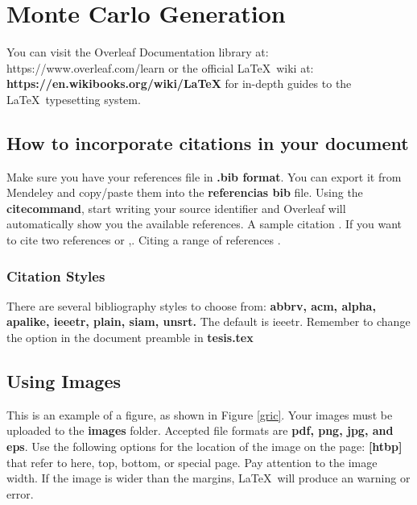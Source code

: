 
\chapter{Monte Carlo Generation}  

\noindent You can visit the Overleaf Documentation library at: https://www.overleaf.com/learn or the official \LaTeX\ wiki at: \textbf{https://en.wikibooks.org/wiki/LaTeX} for in-depth guides to the \LaTeX\ typesetting system.

\section{How to incorporate citations in your document}


\noindent Make sure you have your references file in \textbf{.bib format}. You can export it from Mendeley and copy/paste them into the \textbf{referencias bib} file. Using the \textbf{citecommand}, start writing your source identifier and Overleaf will automatically show you the available references. A sample citation \cite{dirac}. If you want to cite two references \cite{einstein,knuth-fa} or \cite{einstein},\cite{knuth-fa}. Citing a range of references \cite{einstein,knuth-fa,radiation2}.


\subsection{Citation Styles}
\noindent There are several bibliography styles to choose from: \textbf{abbrv, acm, alpha, apalike, ieeetr, plain, siam, unsrt.} The default is ieeetr. Remember to change the option in the document preamble in \textbf{tesis.tex} %


\section{Using Images}





\noindent This is an example of a figure, as shown in Figure \ref{gric}. Your images must be uploaded to the \textbf{images} folder. Accepted file formats are \textbf{pdf, png, jpg, and eps}. Use the following options for the location of the image on the page: \textbf{[htbp]} that refer to here, top, bottom, or special page. Pay attention to the image width. If the image is wider than the margins, \LaTeX\ will produce an warning or error.

